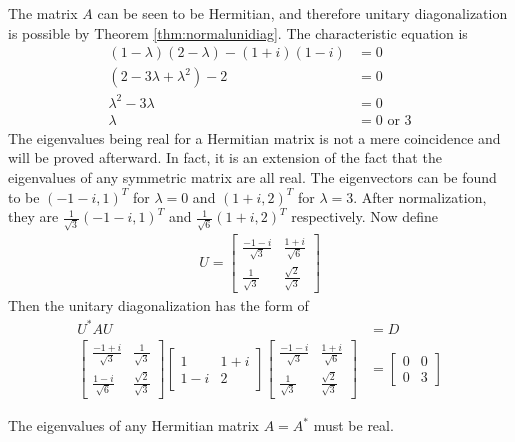\begin{solution}
The matrix $A$ can be seen to be Hermitian, and therefore unitary diagonalization is possible by Theorem \ref{thm:normalunidiag}. The characteristic equation is 
\begin{align*}
(1-\lambda)(2-\lambda) - (1+i)(1-i) &= 0 \\
(2 - 3\lambda + \lambda^2) - 2 &= 0 \\
\lambda^2 - 3\lambda &= 0 \\
\lambda &= 0 \text{ or } 3
\end{align*}
The eigenvalues being real for a Hermitian matrix is not a mere coincidence and will be proved afterward. In fact, it is an extension of the fact that the eigenvalues of any symmetric matrix are all real. The eigenvectors can be found to be $(-1-i, 1)^T$ for $\lambda = 0$ and $(1+i, 2)^T$ for $\lambda = 3$. After normalization, they are $\frac{1}{\sqrt{3}}(-1-i, 1)^T$ and $\frac{1}{\sqrt{6}}(1+i, 2)^T$ respectively. Now define
\begin{align*}
U =
\begin{bmatrix}
\frac{-1-i}{\sqrt{3}} & \frac{1+i}{\sqrt{6}} \\
\frac{1}{\sqrt{3}} & \frac{\sqrt{2}}{\sqrt{3}}
\end{bmatrix}
\end{align*}
Then the unitary diagonalization has the form of
\begin{align*}
U^* AU &= D \\
\begin{bmatrix}
\frac{-1+i}{\sqrt{3}} & \frac{1}{\sqrt{3}} \\
\frac{1-i}{\sqrt{6}} & \frac{\sqrt{2}}{\sqrt{3}}
\end{bmatrix}
\begin{bmatrix}
1 & 1+i \\
1-i & 2
\end{bmatrix}
\begin{bmatrix}
\frac{-1-i}{\sqrt{3}} & \frac{1+i}{\sqrt{6}} \\
\frac{1}{\sqrt{3}} & \frac{\sqrt{2}}{\sqrt{3}}
\end{bmatrix}
&=
\begin{bmatrix}
0 & 0 \\
0 & 3
\end{bmatrix}
\end{align*}
\end{solution}
\begin{proper}
\label{proper:hermrealeig}
The eigenvalues of any Hermitian matrix $A = A^*$ must be real.
\end{proper}
